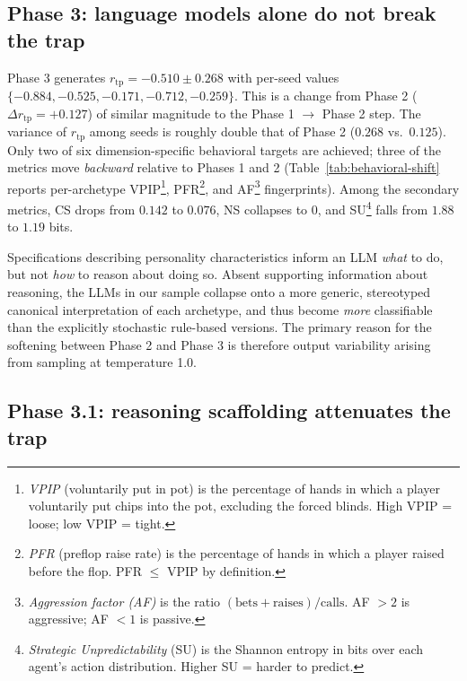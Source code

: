 \documentclass[10pt,twocolumn,letterpaper]{article}
\newcommand{\rtp}{\ensuremath{r_{\mathrm{tp}}}}
\begin{document}

\subsection{Phase 3: language models alone do not break the trap}

Phase 3 generates $\rtp = -0.510 \pm 0.268$ with per-seed values
$\{-0.884, -0.525, -0.171, -0.712, -0.259\}$. This is a change from
Phase 2 ($\Delta\rtp = +0.127$) of similar magnitude to the
Phase 1 $\to$ Phase 2 step. The variance of $\rtp$ among seeds is
roughly double that of Phase 2 ($0.268$ vs.\ $0.125$). Only two of
six dimension-specific behavioral targets are achieved; three of the
metrics move \textit{backward} relative to
Phases 1 and 2 (Table~\ref{tab:behavioral-shift} reports
per-archetype VPIP\footnote{\textit{VPIP} (voluntarily put in
pot) is the percentage of hands in which a player voluntarily
put chips into the pot, excluding the forced blinds. High VPIP =
loose; low VPIP = tight.},
PFR\footnote{\textit{PFR} (preflop raise rate) is the percentage
of hands in which a player raised before the flop. PFR $\le$
VPIP by definition.}, and
AF\footnote{\textit{Aggression factor (AF)} is the ratio
$(\text{bets}+\text{raises})/\text{calls}$. AF $>2$ is
aggressive; AF $<1$ is passive.} fingerprints). Among the secondary
metrics, CS drops from $0.142$ to $0.076$, NS collapses to $0$, and
SU\footnote{\textit{Strategic Unpredictability} (SU) is the
Shannon entropy in bits over each agent's action distribution.
Higher SU = harder to predict.} falls from $1.88$ to $1.19$
bits.



Specifications describing personality characteristics inform an LLM
\textit{what} to do, but not \textit{how} to reason about doing so.
Absent supporting information about reasoning, the LLMs in our sample
collapse onto a more generic, stereotyped canonical interpretation
of each archetype, and thus become \textit{more} classifiable than
the explicitly stochastic rule-based versions. The primary reason
for the softening between Phase 2 and Phase 3 is therefore output
variability arising from sampling at temperature 1.0.


\subsection{Phase 3.1: reasoning scaffolding attenuates the trap}
\end{document}
